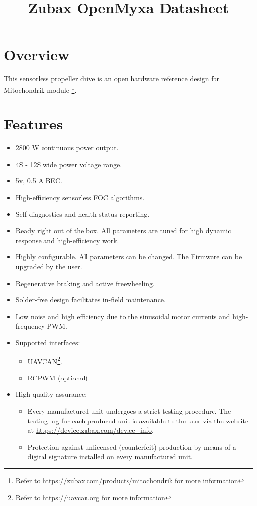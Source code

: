 \documentclass{zubaxdoc}
\title{Zubax OpenMyxa Datasheet}
\begin{document}
\begin{titlepage}
\section*{Overview}
This sensorless propeller drive is an open hardware reference design for Mitochondrik module
\footnote{Refer to \url{https://zubax.com/products/mitochondrik} for more information}.
\section*{Features}

\begin{itemize}
    \item 2800 W continuous power output.
    \item 4S - 12S wide power voltage range.
    \item 5v, 0.5 A BEC.
    \item High-efficiency sensorless FOC algorithms.
    \item Self-diagnostics and health status reporting.
    \item Ready right out of the box. All parameters are tuned for high dynamic response and high-efficiency work.      
    \item Highly configurable. All parameters can be changed. The Firmware can be upgraded by the user.     
    \item Regenerative braking and active freewheeling. 
    \item Solder-free design facilitates in-field maintenance.
    \item Low noise and high efficiency due to the sinusoidal motor currents and high-frequency PWM.
    \item Supported interfaces:
    \begin{itemize}
        \item UAVCAN\footnote{Refer to \url{https://uavcan.org} for more information}.
        \item RCPWM (optional).
    \end{itemize}
    \item High quality assurance:
    \begin{itemize}
        \item Every manufactured unit undergoes a strict testing procedure.
        The testing log for each produced unit is available to the user via the website at
        \url{https://device.zubax.com/device_info}.
        \item Protection against unlicensed (counterfeit) production by means of a digital signature installed on every 
        manufactured unit.
     \end{itemize}
\end{itemize}


\end{titlepage}
\end{document}
